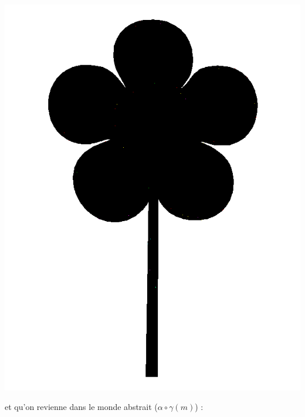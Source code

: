 \documentclass[french]{article}
\begin{document}
  \begin{center}
    \includegraphics[scale=0.19]{./pictures/flower3.png}
  \end{center}
  
  et qu'on revienne dans le monde abstrait ($\alpha \circ \gamma (m)$) :
  
\end{document}
